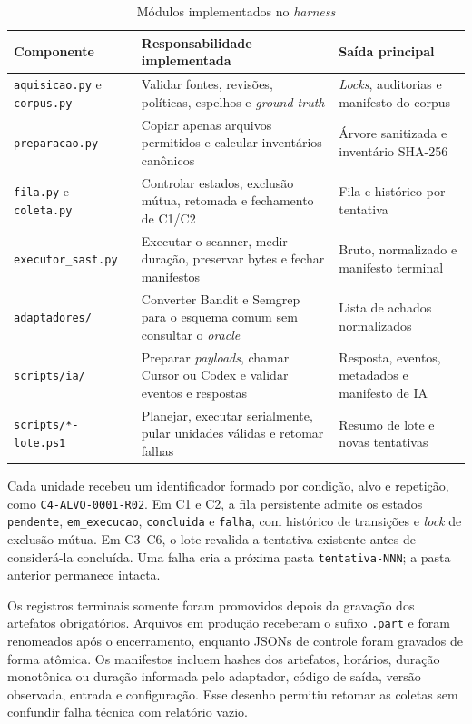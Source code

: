 \begin{table}[htb]
\ABNTEXfontereduzida
\caption{Módulos implementados no \textit{harness}}
\label{tab:modulos-harness}
\centering
\begin{tabularx}{\textwidth}{|l|X|X|}
\hline
\textbf{Componente} & \textbf{Responsabilidade implementada} & \textbf{Saída principal} \\
\hline
\texttt{aquisicao.py} e \texttt{corpus.py} & Validar fontes, revisões, políticas, espelhos e \textit{ground truth} & \textit{Locks}, auditorias e manifesto do corpus \\
\hline
\texttt{preparacao.py} & Copiar apenas arquivos permitidos e calcular inventários canônicos & Árvore sanitizada e inventário SHA-256 \\
\hline
\texttt{fila.py} e \texttt{coleta.py} & Controlar estados, exclusão mútua, retomada e fechamento de C1/C2 & Fila e histórico por tentativa \\
\hline
\texttt{executor\_sast.py} & Executar o scanner, medir duração, preservar bytes e fechar manifestos & Bruto, normalizado e manifesto terminal \\
\hline
\texttt{adaptadores/} & Converter Bandit e Semgrep para o esquema comum sem consultar o \textit{oracle} & Lista de achados normalizados \\
\hline
\texttt{scripts/ia/} & Preparar \textit{payloads}, chamar Cursor ou Codex e validar eventos e respostas & Resposta, eventos, metadados e manifesto de IA \\
\hline
\texttt{scripts/*-lote.ps1} & Planejar, executar serialmente, pular unidades válidas e retomar falhas & Resumo de lote e novas tentativas \\
\hline
\end{tabularx}
\end{table}

Cada unidade recebeu um identificador formado por condição, alvo e repetição, como \texttt{C4-ALVO-0001-R02}. Em C1 e C2, a fila persistente admite os estados \texttt{pendente}, \texttt{em\_execucao}, \texttt{concluida} e \texttt{falha}, com histórico de transições e \textit{lock} de exclusão mútua. Em C3--C6, o lote revalida a tentativa existente antes de considerá-la concluída. Uma falha cria a próxima pasta \texttt{tentativa-NNN}; a pasta anterior permanece intacta.

Os registros terminais somente foram promovidos depois da gravação dos artefatos obrigatórios. Arquivos em produção receberam o sufixo \texttt{.part} e foram renomeados após o encerramento, enquanto JSONs de controle foram gravados de forma atômica. Os manifestos incluem hashes dos artefatos, horários, duração monotônica ou duração informada pelo adaptador, código de saída, versão observada, entrada e configuração. Esse desenho permitiu retomar as coletas sem confundir falha técnica com relatório vazio.


